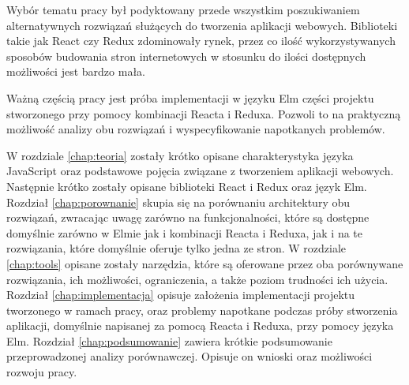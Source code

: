 Wybór tematu pracy był podyktowany przede wszystkim poszukiwaniem alternatywnych rozwiązań służących do tworzenia aplikacji webowych. Biblioteki takie jak React czy Redux zdominowały rynek, przez co ilość wykorzystywanych sposobów budowania stron internetowych w stosunku do ilości dostępnych możliwości jest bardzo mała.

Ważną częścią pracy jest próba implementacji w języku Elm części projektu stworzonego przy pomocy kombinacji Reacta i Reduxa. Pozwoli to na praktyczną możliwość analizy obu rozwiązań i wyspecyfikowanie napotkanych problemów.

W rozdziale \ref{chap:teoria} zostały krótko opisane charakterystyka języka JavaScript oraz podstawowe pojęcia związane z tworzeniem aplikacji webowych. Następnie krótko zostały opisane biblioteki React i Redux oraz język Elm.
Rozdział \ref{chap:porownanie} skupia się na porównaniu architektury obu rozwiązań, zwracając uwagę zarówno na funkcjonalności, które są dostępne domyślnie zarówno w Elmie jak i kombinacji Reacta i Reduxa, jak i na te rozwiązania, które domyślnie oferuje tylko jedna ze stron.
W rozdziale \ref{chap:tools} opisane zostały narzędzia, które są oferowane przez oba porównywane rozwiązania, ich możliwości, ograniczenia, a także poziom trudności ich użycia.
Rozdział \ref{chap:implementacja} opisuje założenia implementacji projektu tworzonego w ramach pracy, oraz problemy napotkane podczas próby stworzenia aplikacji, domyślnie napisanej za pomocą Reacta i Reduxa, przy pomocy języka Elm.
Rozdział \ref{chap:podsumowanie} zawiera krótkie podsumowanie przeprowadzonej analizy porównawczej. Opisuje on wnioski oraz możliwości rozwoju pracy.
